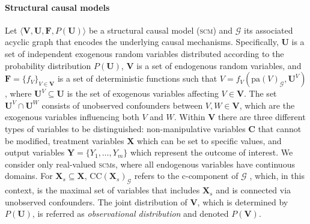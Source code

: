 \paragraph{Structural causal models} Let $\langle \mathbf{V}, \mathbf{U}, \mathbf{F}, P(\textbf{U}) \rangle$ be a structural causal model (\textsc{scm}) \cite{Pearl_00} and $\mathcal{G}$ its associated acyclic graph that encodes the underlying causal mechanisms. 
Specifically, $\mathbf{U}$ is a set of independent exogenous random variables distributed according to the probability distribution $P(\mathbf{U})$, $\mathbf{V}$ is a set of endogenous random variables, and $\mathbf{F} = \{f_V\}_{V \in \mathbf{V}}$ is a set of deterministic functions such that $V = f_V(\text{pa}(V)_{\mathcal{G}}, \mathbf{U}^V)$, where $\mathbf{U}^{V} \subseteq \mathbf{U}$ is the set of exogenous variables affecting $V \in \mathbf{V}$. The set $\mathbf{U}^V \cap \mathbf{U}^W$ consists of unobserved confounders between $V,W \in \mathbf{V}$, which are the exogenous variables influencing both $V$ and $W$. Within $\mathbf{V}$ there are three different types of variables to be distinguished: non-manipulative variables $\mathbf{C}$ that cannot be modified, treatment variables $\mathbf{X}$ which can be set to specific values, and output variables $\mathbf{Y} = \{Y_1,\dots,Y_m\}$ which represent the outcome of interest. We consider only real-valued \textsc{scm}s, where all endogenous variables have continuous domains. 
For $\mathbf{X}_s \subseteq \mathbf{X}$, $\text{CC}(\mathbf{X}_s)_{\mathcal{G}}$ refers to the c-component of $\mathcal{G}$ \citep{do_calculus.proof_3}, which, in this context, is the maximal set of variables that includes $\mathbf{X}_s$ and is connected via unobserved confounders. The joint distribution of $\mathbf{V}$, which is determined by $P(\mathbf{U})$, is referred as \textit{observational distribution} and denoted $P(\mathbf{V})$. 

